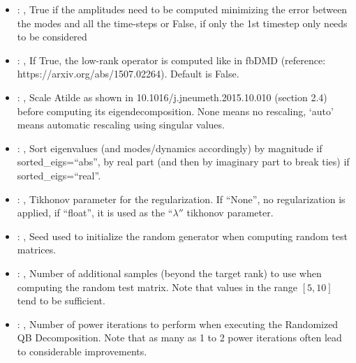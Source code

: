 \begin{itemize}
    \item {}: ,
      True if the amplitudes need to be computed minimizing the error
      between the modes and all the time-steps or False, if only the 1st timestep only needs to be
      considered

    \item {}: ,
      If True, the low-rank operator is computed like in fbDMD (reference:
      https://arxiv.org/abs/1507.02264).                                                  Default is
      False.

    \item {}: ,
      Scale Atilde as shown in 10.1016/j.jneumeth.2015.10.010 (section 2.4) before computing its
      eigendecomposition. None means no rescaling, ‘auto’ means automatic rescaling using singular
      values.

    \item {}: ,
      Sort eigenvalues (and modes/dynamics accordingly) by magnitude if sorted\_eigs=``abs'',
      by real part (and then by imaginary part to break ties) if sorted\_eigs=``real''.

    \item {}: ,
      Tikhonov parameter for the regularization.                                                  If
      ``None'', no regularization is applied, if ``float'', it is used as the
      ``$\lambda''$ tikhonov parameter.

    \item {}: ,
      Seed used to initialize the random generator when computing random test matrices.

    \item {}: ,
      Number of additional samples (beyond the target rank) to use when computing the
      random test matrix. Note that values in the range $[5, 10]$ tend to be sufficient.

    \item {}: ,
      Number of power iterations to perform when executing the Randomized QB Decomposition.
      Note that as many as 1 to 2 power iterations often lead to considerable improvements.
  \end{itemize}

